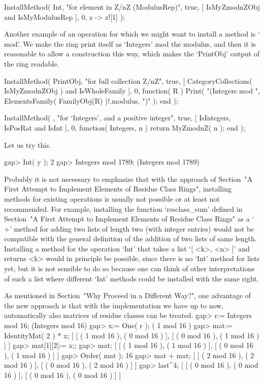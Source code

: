 \begintt
InstallMethod( Int,
    "for element in Z/nZ (ModulusRep)",
    true,
    [ IsMyZmodnZObj and IsMyModulusRep ], 0,
    z -> z![1] );
\endtt

Another example of an operation for which we might want to install
a method is `\\mod'.
We make the ring print itself as `Integers' mod the modulus,
and then it is reasonable to allow a construction this way,
which makes the `PrintObj' output of the ring {\GAP} readable.

\begintt
InstallMethod( PrintObj,
    "for full collection Z/nZ",
    true,
    [ CategoryCollections( IsMyZmodnZObj ) and IsWholeFamily ], 0,
    function( R )
    Print( "(Integers mod ",
           ElementsFamily( FamilyObj(R) )!.modulus, ")" );
    end );

InstallMethod( \mod,
    "for `Integers', and a positive integer",
    true,
    [ IsIntegers, IsPosRat and IsInt ], 0,
    function( Integers, n ) return MyZmodnZ( n ); end );
\endtt

Let us try this.

\begintt
gap> Int( y );
2
gap> Integers mod 1789;
(Integers mod 1789)
\endtt

Probably it is not necessary to emphasize that with the approach of
Section~"A First Attempt to Implement Elements of Residue Class Rings",
installing methods for existing operations is usually not possible or
at least not recommended.
For example, installing the function `resclass_sum' defined in
Section~"A First Attempt to Implement Elements of Residue Class Rings"
as a `\\+' method for adding two lists of length two
(with integer entries) would not be compatible with the general
definition of the addition of two lists of same length.
Installing a method for the operation `Int' that takes a list
`[ <k>, <n> ]' and returns <k> would in principle be possible,
since there is no `Int' method for lists yet,
but it is not sensible to do so because one can think of other
interpretations of such a list where different `Int' methods could
be installed with the same right.

As mentioned in Section~"Why Proceed in a Different Way?",
one advantage of the new approach is that with the implementation
we have up to now, automatically also matrices of residue classes
can be treated.
\begintt
gap> r:= Integers mod 16;
(Integers mod 16)
gap> x:= One( r );
( 1 mod 16 )
gap> mat:= IdentityMat( 2 ) * x;
[ [ ( 1 mod 16 ), ( 0 mod 16 ) ],
  [ ( 0 mod 16 ), ( 1 mod 16 ) ] ]
gap> mat[1][2]:= x;;
gap> mat;
[ [ ( 1 mod 16 ), ( 1 mod 16 ) ],
  [ ( 0 mod 16 ), ( 1 mod 16 ) ] ]
gap> Order( mat );
16
gap> mat + mat;
[ [ ( 2 mod 16 ), ( 2 mod 16 ) ],
  [ ( 0 mod 16 ), ( 2 mod 16 ) ] ]
gap> last^4;
[ [ ( 0 mod 16 ), ( 0 mod 16 ) ],
  [ ( 0 mod 16 ), ( 0 mod 16 ) ] ]
\endtt

